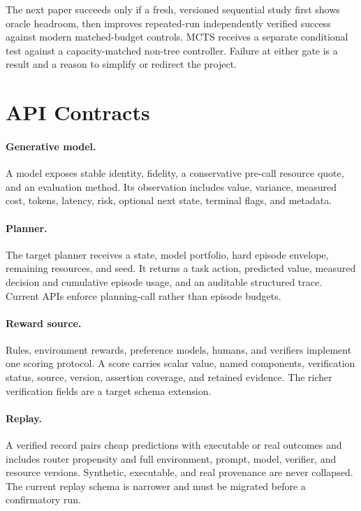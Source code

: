 \documentclass[10pt,twocolumn]{article}
\begin{document}
The next paper succeeds only if a fresh, versioned sequential study first shows
oracle headroom, then improves repeated-run independently verified success
against modern matched-budget controls. MCTS receives a separate conditional
test against a capacity-matched non-tree controller. Failure at either gate is
a result and a reason to simplify or redirect the project.

\appendix

\section{API Contracts}

\paragraph{Generative model.}
A model exposes stable identity, fidelity, a conservative pre-call resource
quote, and an evaluation method. Its observation includes value, variance,
measured cost, tokens, latency, risk, optional next state, terminal flags, and
metadata.

\paragraph{Planner.}
The target planner receives a state, model portfolio, hard episode envelope,
remaining resources, and seed. It returns a task action, predicted value,
measured decision and cumulative episode usage, and an auditable structured
trace. Current APIs enforce planning-call rather than episode budgets.

\paragraph{Reward source.}
Rules, environment rewards, preference models, humans, and verifiers implement
one scoring protocol. A score carries scalar value, named components,
verification status, source, version, assertion coverage, and retained evidence.
The richer verification fields are a target schema extension.

\paragraph{Replay.}
A verified record pairs cheap predictions with executable or real outcomes and
includes router propensity and full environment, prompt, model, verifier, and
resource versions. Synthetic, executable, and real provenance are never
collapsed. The current replay schema is narrower and must be migrated before a
confirmatory run.
\end{document}
